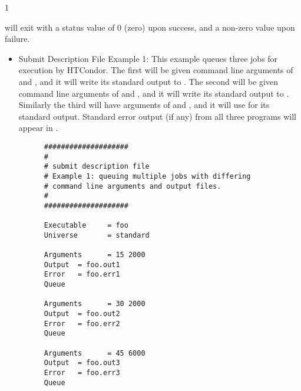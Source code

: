 \begin{ManPage}{\label{man-condor-submit}}{1}
\ExitStatus

 will exit with a status value of 0 (zero) upon success, and a
non-zero value upon failure.

\label{condor-submit-examples}
\Examples

\begin{itemize} 
\item{Submit Description File Example 1:} This example queues three jobs for
execution by HTCondor. The first will be given command line arguments of
 and , and it will write its standard output
to .
The second will be given command line arguments of 
 and , and it will
write its standard output to .
Similarly the third will have
arguments of 
 and , and it will use  for its standard
output. Standard error output (if any) from all three programs will
appear in .

\footnotesize
\begin{verbatim}
      ####################
      #
      # submit description file
      # Example 1: queuing multiple jobs with differing
      # command line arguments and output files.
      #                                                                      
      ####################                                                   
                                                                         
      Executable     = foo                                                   
      Universe       = standard
                                                                         
      Arguments      = 15 2000                                               
      Output  = foo.out1                                                     
      Error   = foo.err1
      Queue                                                                  
                                                                         
      Arguments      = 30 2000                                               
      Output  = foo.out2                                                     
      Error   = foo.err2
      Queue                                                                  
                                                                         
      Arguments      = 45 6000                                               
      Output  = foo.out3                                                     
      Error   = foo.err3
      Queue                   
\end{verbatim}
\normalsize


\end{itemize}
\end{ManPage}
